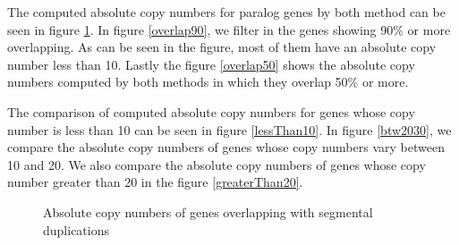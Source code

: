 The computed absolute copy numbers for paralog genes by both method can be seen in figure \ref{unfiltered}. In figure \ref{overlap90}, we filter in the genes showing 90\% or more overlapping. As can be seen in the figure, most of them have an absolute copy number less than 10. Lastly the figure \ref{overlap50} shows the absolute copy numbers computed by both methods in which they overlap 50\% or more.

The comparison of computed absolute copy numbers for genes whose copy number is less than 10 can be seen in figure \ref{lessThan10}. In figure \ref{btw2030}, we compare the absolute copy numbers of genes whose copy numbers vary between 10 and 20. We also compare the absolute copy numbers of genes whose copy number greater than 20 in the figure \ref{greaterThan20}.


\begin{figure}
    \centering
    \quad
    \caption{Absolute copy numbers of genes overlapping with segmental duplications}
    \label{unfiltered}
\end{figure}

